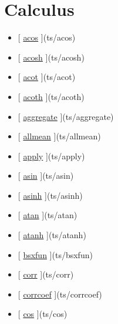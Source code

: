 \documentclass[letterpaper,10pt,english]{sphinxmanual}
\begin{document}
\section{Calculus}
\label{classes/time_series/@ts/ts:calculus}\begin{itemize}
\item {} 
{[} {\hyperref[classes/time_series/@ts/ts:acos]{acos}} {]}(ts/acos)

\item {} 
{[} {\hyperref[classes/time_series/@ts/ts:acosh]{acosh}} {]}(ts/acosh)

\item {} 
{[} {\hyperref[classes/time_series/@ts/ts:acot]{acot}} {]}(ts/acot)

\item {} 
{[} {\hyperref[classes/time_series/@ts/ts:acoth]{acoth}} {]}(ts/acoth)

\item {} 
{[} {\hyperref[classes/time_series/@ts/ts:aggregate]{aggregate}} {]}(ts/aggregate)

\item {} 
{[} {\hyperref[classes/time_series/@ts/ts:allmean]{allmean}} {]}(ts/allmean)

\item {} 
{[} {\hyperref[classes/time_series/@ts/ts:apply]{apply}} {]}(ts/apply)

\item {} 
{[} {\hyperref[classes/time_series/@ts/ts:asin]{asin}} {]}(ts/asin)

\item {} 
{[} {\hyperref[classes/time_series/@ts/ts:asinh]{asinh}} {]}(ts/asinh)

\item {} 
{[} {\hyperref[classes/time_series/@ts/ts:atan]{atan}} {]}(ts/atan)

\item {} 
{[} {\hyperref[classes/time_series/@ts/ts:atanh]{atanh}} {]}(ts/atanh)

\item {} 
{[} {\hyperref[classes/time_series/@ts/ts:bsxfun]{bsxfun}} {]}(ts/bsxfun)

\item {} 
{[} {\hyperref[classes/time_series/@ts/ts:corr]{corr}} {]}(ts/corr)

\item {} 
{[} {\hyperref[classes/time_series/@ts/ts:corrcoef]{corrcoef}} {]}(ts/corrcoef)

\item {} 
{[} {\hyperref[classes/time_series/@ts/ts:cos]{cos}} {]}(ts/cos)


\end{itemize}
\end{document}
